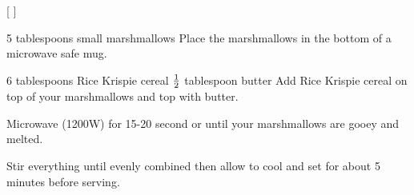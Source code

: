 
[
]

\begin{step}
5 tablespoons small marshmallows
\method
Place the marshmallows in the bottom of a microwave safe mug.
\end{step}

\begin{step}
6 tablespoons Rice Krispie cereal
$\frac{1}{2}$ tablespoon butter
\method
Add Rice Krispie cereal on top of your marshmallows and top with butter.

Microwave (1200W) for 15-20 second or until your marshmallows are gooey and melted.

Stir everything until evenly combined then allow to cool and set for about 5 minutes before serving.
\end{step}